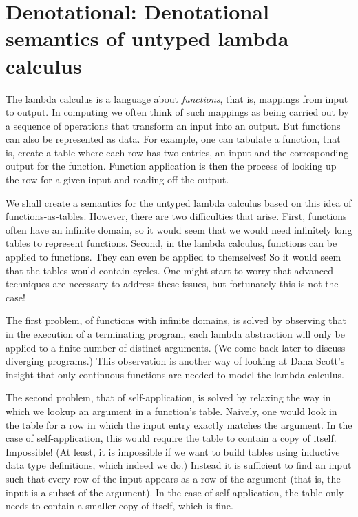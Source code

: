\hypertarget{Denotational}{%
\chapter{Denotational: Denotational semantics of untyped lambda
calculus}\label{Denotational}}

\begin{fence}
\begin{code}%
\>[0]\AgdaSpace{}%
\AgdaSpace{}%
\<%
\end{code}
\end{fence}

The lambda calculus is a language about \emph{functions}, that is,
mappings from input to output. In computing we often think of such
mappings as being carried out by a sequence of operations that transform
an input into an output. But functions can also be represented as data.
For example, one can tabulate a function, that is, create a table where
each row has two entries, an input and the corresponding output for the
function. Function application is then the process of looking up the row
for a given input and reading off the output.

We shall create a semantics for the untyped lambda calculus based on
this idea of functions-as-tables. However, there are two difficulties
that arise. First, functions often have an infinite domain, so it would
seem that we would need infinitely long tables to represent functions.
Second, in the lambda calculus, functions can be applied to functions.
They can even be applied to themselves! So it would seem that the tables
would contain cycles. One might start to worry that advanced techniques
are necessary to address these issues, but fortunately this is not the
case!

The first problem, of functions with infinite domains, is solved by
observing that in the execution of a terminating program, each lambda
abstraction will only be applied to a finite number of distinct
arguments. (We come back later to discuss diverging programs.) This
observation is another way of looking at Dana Scott's insight that only
continuous functions are needed to model the lambda calculus.

The second problem, that of self-application, is solved by relaxing the
way in which we lookup an argument in a function's table. Naively, one
would look in the table for a row in which the input entry exactly
matches the argument. In the case of self-application, this would
require the table to contain a copy of itself. Impossible! (At least, it
is impossible if we want to build tables using inductive data type
definitions, which indeed we do.) Instead it is sufficient to find an
input such that every row of the input appears as a row of the argument
(that is, the input is a subset of the argument). In the case of
self-application, the table only needs to contain a smaller copy of
itself, which is fine.

